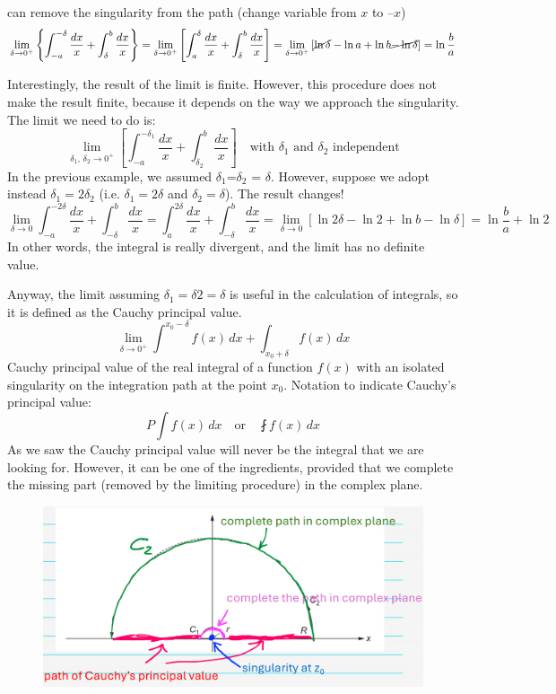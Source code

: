 \documentclass{article}
\begin{document}
\noindent
can remove the singularity from the path (change variable from $x$ to $–x$)
\begin{equation}
    \lim_{\delta \to 0^+} \left\{ \int_{-a}^{-\delta} \frac{dx}{x} + \int_{\delta}^{b} \frac{dx}{x} \right\} 
= \lim_{\delta \to 0^+} \left[ \int_{a}^{\delta} \frac{dx}{x} + \int_{\delta}^{b} \frac{dx}{x} \right] = \lim_{\delta \to 0^+} \left[ \cancel{\ln \delta} - \ln a + \ln b \cancel{- \ln \delta} \right] 
= \ln{\frac{b}{a}}
\end{equation}

\newpage

\noindent
Interestingly, the result of the limit is finite. However, this procedure does not make the result finite, because it depends on the way we approach the singularity. The limit we need to do is:
\begin{equation}
    \lim_{\delta_1, \, \delta_2 \to 0^+}
\left[
\int_{-a}^{-\delta_1} \frac{dx}{x}
+
\int_{\delta_2}^{b} \frac{dx}{x}
\right] \quad \text{with $\delta_1$ and $\delta_2$ independent}
\end{equation}
In the previous example, we assumed $\delta_1$=$\delta_2$ = $\delta$. However, suppose we adopt instead $\delta_1=2\delta_2$ (i.e. $\delta_1=2\delta$ and $\delta_2=\delta$). The result changes! 
\begin{equation}
    \lim_{\delta \to 0} 
\int_{-a}^{-2\delta} \frac{dx}{x}
+ 
\int_{-\delta}^{b} \frac{dx}{x}
=
\int_{a}^{2\delta} \frac{dx}{x}
+
\int_{-\delta}^{b} \frac{dx}{x}
=
\lim_{\delta \to 0}
\left[
\ln 2\delta - \ln 2 + \ln b - \ln \delta
\right]=
\ln \frac{b}{a} + \ln 2
\end{equation}
In other words, the integral is really divergent, and the limit has no definite value.

\noindent
Anyway, the limit assuming $\delta_1=\delta2= \delta$ is useful in the calculation of integrals, so it is defined as the Cauchy principal value.
\begin{equation}
    \lim_{\delta \to 0^+} \int^{x_0 - \delta} f(x)\, dx + \int_{x_0 + \delta} f(x)\, dx
\end{equation}
Cauchy principal value of the real integral of a function $f(x)$ with an isolated singularity on the integration path at the point $x_0$. Notation to indicate Cauchy’s principal value:
\begin{equation}
    P \int f(x)\, dx \quad \text{or} \quad \fint f(x)\, dx
\end{equation}
As we saw the Cauchy principal value will never be the integral that we are looking for. However, it can be one of the ingredients, provided that we complete the missing part (removed by the limiting procedure) in the complex plane.
\begin{figure}[h]
    \centering
    \includegraphics[width=0.6\linewidth]{fig32.png}
\end{figure}
\end{document}
